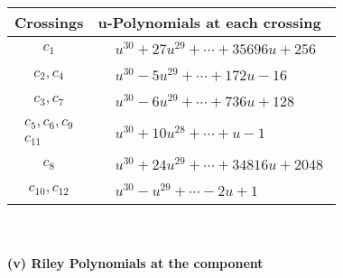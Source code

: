 \documentclass[1p]{elsarticle_modified}
\theoremstyle{definition}
\begin{document}
\begin{tabular}{m{50pt}|m{274pt}}
Crossings & \hspace{64pt}u-Polynomials at each crossing \\
\hline $$\begin{aligned}c_{1}\end{aligned}$$&$\begin{aligned}
&u^{30}+27 u^{29}+\cdots+35696 u+256
\end{aligned}$\\
\hline $$\begin{aligned}c_{2},c_{4}\end{aligned}$$&$\begin{aligned}
&u^{30}-5 u^{29}+\cdots+172 u-16
\end{aligned}$\\
\hline $$\begin{aligned}c_{3},c_{7}\end{aligned}$$&$\begin{aligned}
&u^{30}-6 u^{29}+\cdots+736 u+128
\end{aligned}$\\
\hline $$\begin{aligned}c_{5},c_{6},c_{9}\\c_{11}\end{aligned}$$&$\begin{aligned}
&u^{30}+10 u^{28}+\cdots+u-1
\end{aligned}$\\
\hline $$\begin{aligned}c_{8}\end{aligned}$$&$\begin{aligned}
&u^{30}+24 u^{29}+\cdots+34816 u+2048
\end{aligned}$\\
\hline $$\begin{aligned}c_{10},c_{12}\end{aligned}$$&$\begin{aligned}
&u^{30}- u^{29}+\cdots-2 u+1
\end{aligned}$\\
\hline
\end{tabular}\\~\\
\newpage\renewcommand{\arraystretch}{1}
\flushleft \textbf{(v) Riley Polynomials at the component}\newline \\
\end{document}
